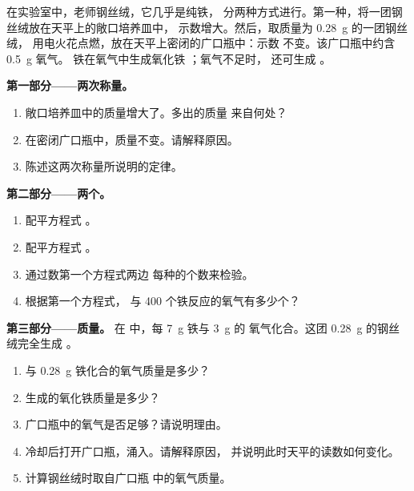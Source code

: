 \begin{problem}
\label{pb:g8:balanced-equations:1}
在实验室中，老师钢丝绒，它几乎是纯铁，
分两种方式进行。第一种，将一团钢丝绒放在天平上的敞口培养皿中，
示数增大。然后，取质量为 \qty{0.28}{g} 的一团钢丝绒，
用电火花点燃，放在天平上密闭的广口瓶中：示数
不变。该广口瓶中约含 \qty{0.5}{g} 氧气。
铁在氧气中生成氧化铁 ；氧气不足时，
还可生成 。

\medskip
\noindent\textbf{第一部分——两次称量。}
\begin{enumerate}
  \item 敞口培养皿中的质量增大了。多出的质量
        来自何处？
  \item 在密闭广口瓶中，质量不变。请解释原因。
  \item 陈述这两次称量所说明的定律。
\end{enumerate}

\medskip
\noindent\textbf{第二部分——两个。}
\begin{enumerate}[resume]
  \item 配平方程式 。 %
  \item 配平方程式 。 %
  \item 通过数第一个方程式两边
        每种的个数来检验。
  \item 根据第一个方程式，
        与 400 个铁反应的氧气有多少个？
\end{enumerate}

\medskip
\noindent\textbf{第三部分——质量。}
在  中，每 \qty{7}{g} 铁与 \qty{3}{g} 的
氧气化合。这团 \qty{0.28}{g} 的钢丝绒完全生成 。
\begin{enumerate}[resume]
  \item 与 \qty{0.28}{g} 铁化合的氧气质量是多少？
  \item 生成的氧化铁质量是多少？
  \item 广口瓶中的氧气是否足够？请说明理由。
  \item 冷却后打开广口瓶，涌入。请解释原因，
        并说明此时天平的读数如何变化。
  \item 计算钢丝绒时取自广口瓶
        中的氧气质量。
\end{enumerate}
\end{problem}
